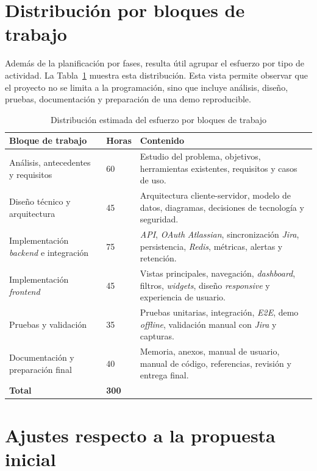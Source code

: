 \section{Distribución por bloques de trabajo}

Además de la planificación por fases, resulta útil agrupar el esfuerzo por tipo de actividad. La Tabla~\ref{tab:planificacion-bloques} muestra esta distribución. Esta vista permite observar que el proyecto no se limita a la programación, sino que incluye análisis, diseño, pruebas, documentación y preparación de una demo reproducible.

\begin{table}[htbp]
\centering
\small
\renewcommand{\arraystretch}{1.18}
\begin{tabularx}{\textwidth}{p{4.4cm}p{2.2cm}X}
\toprule
\textbf{Bloque de trabajo} & \textbf{Horas} & \textbf{Contenido} \\
\midrule
Análisis, antecedentes y requisitos & 60 & Estudio del problema, objetivos, herramientas existentes, requisitos y casos de uso. \\
Diseño técnico y arquitectura & 45 & Arquitectura cliente-servidor, modelo de datos, diagramas, decisiones de tecnología y seguridad. \\
Implementación \textit{backend} e integración & 75 & \textit{API}, \textit{OAuth} \textit{Atlassian}, sincronización \textit{Jira}, persistencia, \textit{Redis}, métricas, alertas y retención. \\
Implementación \textit{frontend} & 45 & Vistas principales, navegación, \textit{dashboard}, filtros, \textit{widgets}, diseño \textit{responsive} y experiencia de usuario. \\
Pruebas y validación & 35 & Pruebas unitarias, integración, \textit{E2E}, demo \textit{offline}, validación manual con \textit{Jira} y capturas. \\
Documentación y preparación final & 40 & Memoria, anexos, manual de usuario, manual de código, referencias, revisión y entrega final. \\
\midrule
\textbf{Total} & \textbf{300} & \\
\bottomrule
\end{tabularx}
\caption{Distribución estimada del esfuerzo por bloques de trabajo}
\label{tab:planificacion-bloques}
\end{table}

\section{Ajustes respecto a la propuesta inicial}


